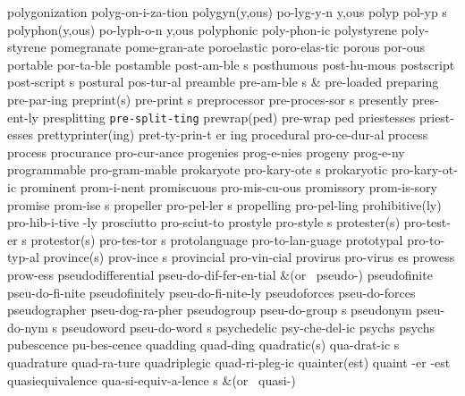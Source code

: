 \1 polygonization	polyg-on-i-za-tion
\2 polygyn(y,ous)	po-lyg-y-n y,ous	%
\5 polyp		pol-yp s
\2 polyphon(y,ous)	po-lyph-o-n y,ous
\1 polyphonic		poly-phon-ic		%
\1 polystyrene		poly-styrene
\1 pomegranate		pome-gran-ate
\1 poroelastic		poro-elas-tic
\1 porous		por-ous
\1 portable		por-ta-ble		%
\5 postamble		post-am-ble s
\1 posthumous		post-hu-mous	%
\5 postscript		post-script s
\1 postural		pos-tur-al
\5 preamble		pre-am-ble s
 & pre-loaded \cr
\1 preparing		pre-par-ing
\2 preprint(s)		pre-print s
\5 preprocessor		pre-proces-sor s
\1 presently		pres-ent-ly		%
\1 presplitting 	{\tt\bs pre-split-ting}
\2 prewrap(ped)		pre-wrap ped		%
\1 priestesses		priest-esses
\3 prettyprinter(ing)	pret-ty-prin-t er ing
\1 procedural		pro-ce-dur-al
\1 process		process\thinspace*
\1 procurance		pro-cur-ance
\1 progenies		prog-e-nies
\1 progeny		prog-e-ny
\1 programmable		pro-gram-mable		%
\NewWordtrue
\5 prokaryote		pro-kary-ote s 		%
\NewWordtrue
\1 prokaryotic		pro-kary-ot-ic		%
\1 prominent		prom-i-nent		%
\1 promiscuous		pro-mis-cu-ous		%
\1 promissory		prom-is-sory		%
\5 promise		prom-ise s		%
\5 propeller		pro-pel-ler s		%
\1 propelling		pro-pel-ling		%
\2 prohibitive(ly)	pro-hib-i-tive -ly
\1 prosciutto		pro-sciut-to
\NewWordtrue
\5 prostyle		pro-style s		%
\2 protester(s)		pro-test-er s
\2 protestor(s)		pro-tes-tor s
\1 protolanguage	pro-to-lan-guage     %
\1 prototypal		pro-to-typ-al
\2 province(s)		prov-ince s		%
\1 provincial		pro-vin-cial		%
\NewWordtrue
\5 provirus		pro-virus es		%
\1 prowess		prow-ess		%
\1 pseudodifferential	pseu-do-dif-fer-en-tial
\tabalign {}		&\null\quad (or \ pseudo-{}) \cr
\1 pseudofinite 	pseu-do-fi-nite
\1 pseudofinitely	pseu-do-fi-nite-ly
\1 pseudoforces 	pseu-do-forces
\1 pseudographer	pseu-dog-ra-pher	%
\5 pseudogroup		pseu-do-group s		%
\5 pseudonym		pseu-do-nym s
\5 pseudoword		pseu-do-word s
\1 psychedelic		psy-che-del-ic
\1 psychs		psychs
\1 pubescence		pu-bes-cence
\1 quadding		quad-ding
\2 quadratic(s)		qua-drat-ic s
\1 quadrature		quad-ra-ture
\1 quadriplegic		quad-ri-pleg-ic
\3 quainter(est)	quaint -er -est
\5 quasiequivalence	qua-si-equiv-a-lence s
\tabalign {}		&\null\quad (or \ quasi-{}) \cr

